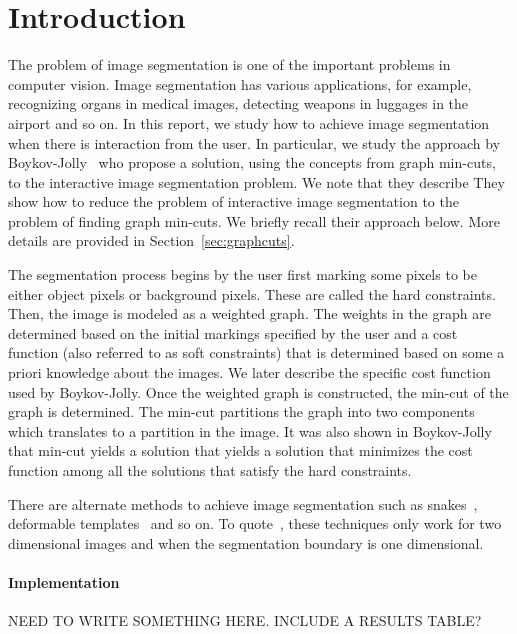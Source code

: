 \documentclass{acm}
\newcommand{\pnote}[1]{{\color{blue} Prabhanjan's note: #1}}
\begin{document}
\section{Introduction}
The problem of image segmentation is one of the important problems in computer vision. Image segmentation has various applications, for example, recognizing organs in medical images, detecting weapons in luggages in the airport and so on. In this report, we study how to achieve image segmentation when there is interaction from the user. In particular, we study the approach by Boykov-Jolly~\cite{BJ01} who propose a solution, using the concepts from graph min-cuts, to the interactive image segmentation problem. We note that they describe  They show how to reduce the problem of interactive image segmentation to the problem of finding graph min-cuts. We briefly recall their approach below. More details are provided in Section~\ref{sec:graphcuts}. 

The segmentation process begins by the user first marking some pixels to be either object pixels or background pixels. These are called the hard constraints. Then, the image is modeled as a weighted graph. The weights in the graph are determined based on the initial markings specified by the user and a cost function (also referred to as soft constraints) that is determined based on some a priori knowledge about the images. We later describe the specific cost function used by Boykov-Jolly. Once the weighted graph is constructed, the min-cut of the graph is determined. The min-cut partitions the graph into two components which translates to a partition in the image. It was also shown in Boykov-Jolly that min-cut yields a solution that yields a solution that minimizes the cost function among all the solutions that satisfy the hard constraints. 

\noindent There are alternate methods to achieve image segmentation such as snakes~\cite{KWT88,Cohen91}, deformable templates~\cite{YHC92} and so on. To quote~\cite{BJ01}, these techniques only work for two dimensional images and when the segmentation boundary is one dimensional. 

\paragraph{Implementation}
NEED TO WRITE SOMETHING HERE. INCLUDE A RESULTS TABLE? 
  

\end{document}
